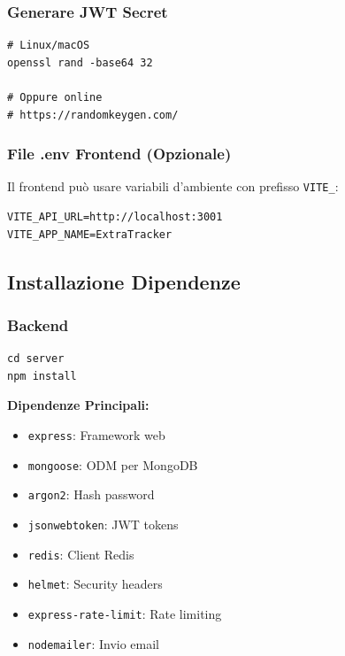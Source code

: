 \documentclass[11pt,a4paper]{article}
\newcommand{\code}[1]{\texttt{#1}}
\begin{document}
\subsubsection{Generare JWT Secret}

\begin{lstlisting}[caption=Generare JWT Secret Forte]
# Linux/macOS
openssl rand -base64 32

# Oppure online
# https://randomkeygen.com/
\end{lstlisting}

\subsubsection{File .env Frontend (Opzionale)}

Il frontend può usare variabili d'ambiente con prefisso \code{VITE\_}:

\begin{lstlisting}[caption=.env - Frontend (Opzionale)]
VITE_API_URL=http://localhost:3001
VITE_APP_NAME=ExtraTracker
\end{lstlisting}

\subsection{Installazione Dipendenze}

\subsubsection{Backend}

\begin{lstlisting}[caption=Installazione Dipendenze Backend]
cd server
npm install
\end{lstlisting}

\textbf{Dipendenze Principali:}
\begin{itemize}
    \item \code{express}: Framework web
    \item \code{mongoose}: ODM per MongoDB
    \item \code{argon2}: Hash password
    \item \code{jsonwebtoken}: JWT tokens
    \item \code{redis}: Client Redis
    \item \code{helmet}: Security headers
    \item \code{express-rate-limit}: Rate limiting
    \item \code{nodemailer}: Invio email
\end{itemize}
\end{document}
